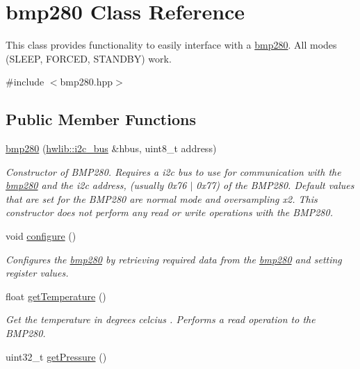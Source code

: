 \hypertarget{classbmp280}{}\section{bmp280 Class Reference}
\label{classbmp280}


This class provides functionality to easily interface with a \mbox{\hyperlink{classbmp280}{bmp280}}. All modes (S\+L\+E\+EP, F\+O\+R\+C\+ED, S\+T\+A\+N\+D\+BY) work.  




{\ttfamily \#include $<$bmp280.\+hpp$>$}

\subsection*{Public Member Functions}
\begin{DoxyCompactItemize}
\item 
\mbox{\hyperlink{classbmp280_a36d36891ce38ec1d077e8c825ff99d89}{bmp280}} (\mbox{\hyperlink{classhwlib_1_1i2c__bus}{hwlib\+::i2c\+\_\+bus}} \&hbus, uint8\+\_\+t address)
\begin{DoxyCompactList}\small\item\em Constructor of B\+M\+P280. Requires a i2c bus to use for communication with the \mbox{\hyperlink{classbmp280}{bmp280}} and the i2c address, (usually 0x76 $\vert$ 0x77) of the B\+M\+P280. Default values that are set for the B\+M\+P280 are normal mode and oversampling x2. This constructor does not perform any read or write operations with the B\+M\+P280. \end{DoxyCompactList}\item 
void \mbox{\hyperlink{classbmp280_a5d525e6ca33f2df3d829e78bf48f06a1}{configure}} ()
\begin{DoxyCompactList}\small\item\em Configures the \mbox{\hyperlink{classbmp280}{bmp280}} by retrieving required data from the \mbox{\hyperlink{classbmp280}{bmp280}} and setting register values. \end{DoxyCompactList}\item 
float \mbox{\hyperlink{classbmp280_a7f3426799bc90f9435b22fa44a40387c}{get\+Temperature}} ()
\begin{DoxyCompactList}\small\item\em Get the temperature in degrees celcius . Performs a read operation to the B\+M\+P280. \end{DoxyCompactList}\item 
uint32\+\_\+t \mbox{\hyperlink{classbmp280_a4c2b8a1a167683a819d2653c4be37bc9}{get\+Pressure}} ()

\end{DoxyCompactItemize}
